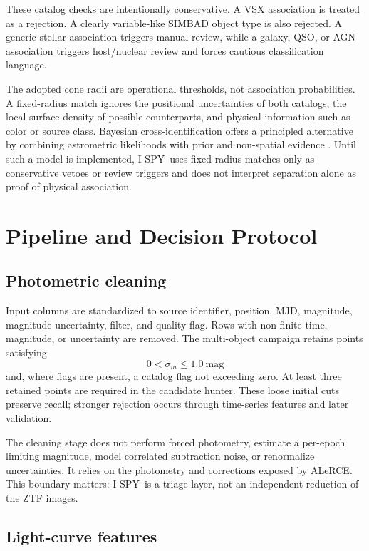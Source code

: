 \documentclass[11pt]{article}
\newcommand{\legacycampaign}{I SPY}
\begin{document}
These catalog checks are intentionally conservative. A VSX association is treated as a rejection. A clearly variable-like SIMBAD object type is also rejected. A generic stellar association triggers manual review, while a galaxy, QSO, or AGN association triggers host/nuclear review and forces cautious classification language.

The adopted cone radii are operational thresholds, not association probabilities. A fixed-radius match ignores the positional uncertainties of both catalogs, the local surface density of possible counterparts, and physical information such as color or source class. Bayesian cross-identification offers a principled alternative by combining astrometric likelihoods with prior and non-spatial evidence \citep{budavari2008}. Until such a model is implemented, \legacycampaign\ uses fixed-radius matches only as conservative vetoes or review triggers and does not interpret separation alone as proof of physical association.

\section{Pipeline and Decision Protocol}
\label{sec:methods}

\subsection{Photometric cleaning}

Input columns are standardized to source identifier, position, MJD, magnitude, magnitude uncertainty, filter, and quality flag. Rows with non-finite time, magnitude, or uncertainty are removed. The multi-object campaign retains points satisfying
\begin{equation}
  0 < \sigma_m \leq 1.0~\mathrm{mag}
\end{equation}
and, where flags are present, a catalog flag not exceeding zero. At least three retained points are required in the candidate hunter. These loose initial cuts preserve recall; stronger rejection occurs through time-series features and later validation.

The cleaning stage does not perform forced photometry, estimate a per-epoch limiting magnitude, model correlated subtraction noise, or renormalize uncertainties. It relies on the photometry and corrections exposed by ALeRCE. This boundary matters: \legacycampaign\ is a triage layer, not an independent reduction of the ZTF images.

\subsection{Light-curve features}
\end{document}
